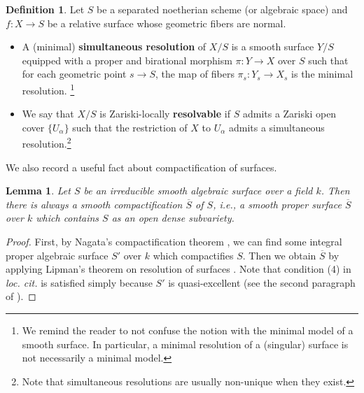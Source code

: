 \documentclass[11pt, letterpaper]{amsart}
\theoremstyle{plain}
\newtheorem{lemma}[theorem]{Lemma}
\theoremstyle{definition}
\newtheorem{definition}[theorem]{Definition}
\newcommand{\<}{\langle}
\renewcommand{\>}{\rangle}
\begin{document}

\begin{definition}
\label{def: resolution}
    Let $S$ be a separated noetherian scheme (or algebraic space) and $f : X \to S$ be a relative surface whose geometric fibers are normal. 
    \begin{itemize}
        \item A (minimal) \textbf{simultaneous resolution} of $X/S$ is a smooth surface $Y/S$ equipped with a proper and birational morphism $\pi : Y \to X$ over $S$ such that for each geometric point $s \to S$, the map of fibers $\pi_s : Y_s \to X_s$ is the minimal resolution. 
        \footnote{We remind the reader to not confuse the notion with the minimal model of a smooth surface. In particular, a minimal resolution of a (singular) surface is not necessarily a minimal model.}
        \item We say that $X/S$ is Zariski-locally \textbf{resolvable} if $S$ admits a Zariski open cover $\{ U_\alpha \}$ such that the restriction of $X$ to $U_\alpha$ admits a simultaneous resolution.\footnote{Note that simultaneous resolutions are usually non-unique when they exist. } 
    \end{itemize}
\end{definition}

We also record a useful fact about compactification of surfaces.
\begin{lemma}
\label{lem: smooth compactification}
    Let $S$ be an irreducible smooth algebraic surface over a field $k$. Then there is always a smooth compactification $\overline{S}$ of $S$, i.e., a smooth proper surface $\overline{S}$ over $k$ which contains $S$ as an open dense subvariety. 
\end{lemma}
\begin{proof}
    First, by Nagata's compactification theorem \cite[\href{https://stacks.math.columbia.edu/tag/0F41}{Tag 0F41}]{stacks-project}, we can find some integral proper algebraic surface $S'$ over $k$ which compactifies $S$. Then we obtain $\overline{S}$ by applying Lipman's theorem on resolution of surfaces \cite[\href{https://stacks.math.columbia.edu/tag/0BGP}{Tag 0BGP}]{stacks-project}. Note that condition (4) in \textit{loc. cit.} is satisfied simply because $S'$ is quasi-excellent (see the second paragraph of \cite[\href{https://stacks.math.columbia.edu/tag/0ADX}{Tag 0ADX}]{stacks-project}). 
\end{proof}
\end{document}

